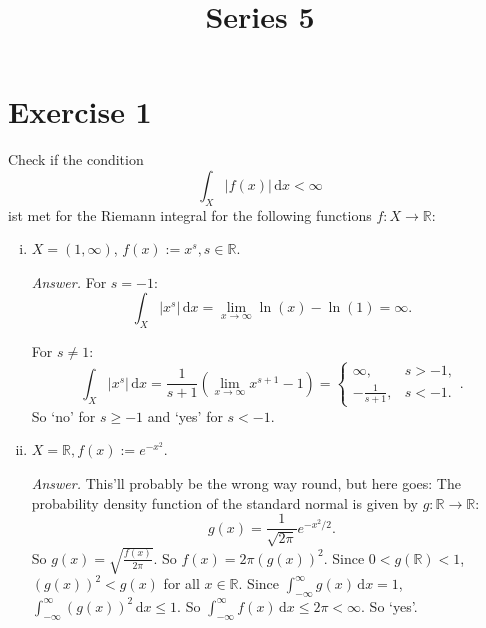 \documentclass[10pt]{article}\usepackage[]{graphicx}\usepackage[]{color}
\title{Series 5}
\date{}
\newcommand{\R}{\mathbb{R}}
\newcommand{\df}{\,\textrm{d}}
\begin{document}
\maketitle

\section*{Exercise 1}
Check if the condition
\[
  \int_X |f(x)| \df x < \infty
\]
ist met for the Riemann integral for the following functions $f: X \to \R$:
\begin{enumerate}[(i)]
  \item $X = (1, \infty)$, $f(x) := x^s, s \in \R$.

  \textit{Answer.}  For $s = -1$:
  \[
    \int_X |x^s| \df x = \lim_{x \to \infty} \ln(x) - \ln(1) = \infty.
  \]


  For $s \neq 1$:
  \[
    \int_X |x^s| \df x = \frac{1}{s+1} (\lim_{x \to \infty} x^{s+1} - 1) = \begin{cases}
      \infty, & s > -1,\\
      -\frac{1}{s+1}, & s < -1.
    \end{cases}.
  \]
  So `no' for $s \geq -1$ and `yes' for $s < -1$.

  \item $X = \R, f(x) := e^{-x^2}$.

  \textit{Answer.}
  This'll probably be the wrong way round, but here goes:
  The probability density function
  of the standard normal is given by $g: \R \to \R$:
  \[
    g(x) = \frac{1}{\sqrt{2\pi}}e^{-x^2/2}.
  \]
  So $g(x) = \sqrt{\frac{f(x)}{2\pi}}$.
  So $f(x) = 2\pi (g(x))^2$.
  Since $0 < g(\R) < 1$,
  $(g(x))^2 < g(x)$ for all $x \in \R$.
  Since $\int_{-\infty}^{\infty} g(x) \df x = 1$,
  $\int_{-\infty}^{\infty} (g(x))^2 \df x \leq 1$.
  So $\int_{-\infty}^{\infty} f(x) \df x \leq 2\pi < \infty$.
  So `yes'.
\end{enumerate}
\end{document}

